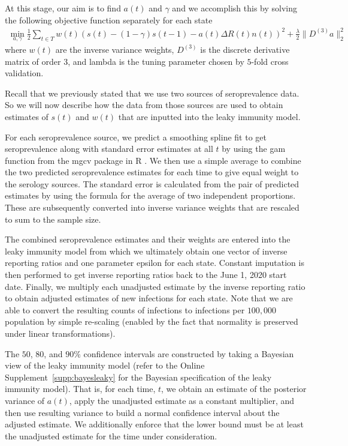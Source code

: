 \documentclass{article}
\begin{document}
At this stage, our aim is to find $a(t)$ and $\gamma$ and we accomplish this by solving the following objective function separately for each state
\begin{align*}
\min_{a, \gamma}\frac{1}{2}\sum_{t \in T}w(t)\left (s(t) - (1 -\gamma)s(t-1)-a(t)\Delta R(t)n(t)  \right )^2 + \frac{\lambda}{2} \|D^{(3)}a\|_2^2 \label{eqn-leakymod}
\end{align*}
where $w(t)$ are the inverse variance weights, $D^{(3)}$ is the discrete derivative matrix of order $3$, and lambda is the tuning parameter chosen by $5$-fold cross validation. 

Recall that we previously stated that we use two sources of seroprevalence data. So we will now describe how the data from those sources are used to obtain estimates of $s(t)$ and $w(t)$ that are inputted into the leaky immunity model.

For each seroprevalence source, we predict a smoothing spline fit to get seroprevalence along with standard error estimates at all $t$ by using the gam function from the mgcv package in R \citep{wood2011fast}. We then use a simple average to combine the two predicted seroprevalence estimates for each time to give equal weight to the serology sources. The standard error is calculated from the pair of predicted estimates by using the formula for the average of two independent proportions. These are subsequently converted into inverse variance weights that are rescaled to sum to the sample size.

The combined seroprevalence estimates and their weights are entered into the leaky immunity model from which we ultimately obtain one vector of inverse reporting ratios and one parameter epsilon for each state. Constant imputation is then performed to get inverse reporting ratios back to the June 1, 2020 start date. Finally, we multiply each unadjusted estimate by the inverse reporting ratio to obtain adjusted estimates of new infections for each state. Note that we are able to convert the resulting counts of infections to infections per $100,000$ population by simple re-scaling (enabled by the fact that normality is preserved under linear transformations).

The $50$, $80$, and $90\%$ confidence intervals are constructed by taking a Bayesian view of the leaky immunity model (refer to the Online Supplement~\ref{supp:bayesleaky} for the Bayesian specification of the leaky immunity model). That is, for each time, $t$, we obtain an estimate of the posterior variance of $a(t)$, apply the unadjusted estimate as a constant multiplier, and then use resulting variance to build a normal confidence interval about the adjusted estimate. We additionally enforce that the lower bound must be at least the unadjusted estimate for the time under consideration.
\end{document}
